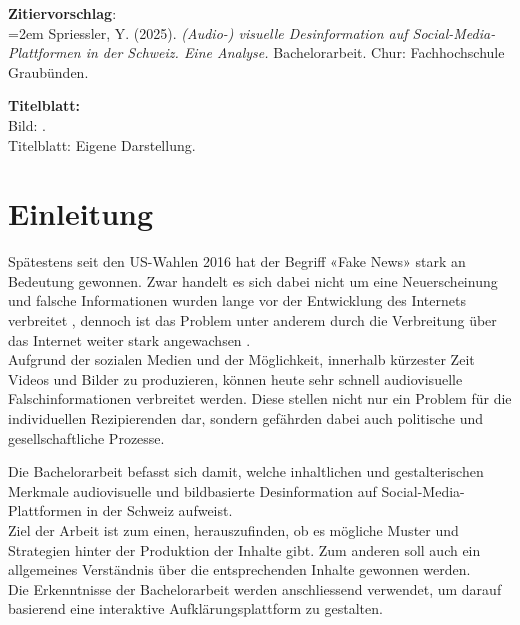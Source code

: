 \documentclass[12pt,a4paper]{article}        %
\begin{document}
\textbf{Zitiervorschlag}:\\
\hangindent=2em
Spriessler, Y. (2025). \textit{(Audio-) visuelle Desinformation auf Social-Media-Plattformen in der Schweiz. Eine Analyse.} Bachelorarbeit. Chur: Fachhochschule Graubünden.

\textbf{Titelblatt:}\\
Bild: .\\
Titelblatt: Eigene Darstellung.
\pagebreak
\thispagestyle{empty}
\tableofcontents        %
\pagebreak

\listoffigures
\listoftables
\pagebreak
\setcounter{page}{1}    %
\section{Einleitung}
Spätestens seit den US-Wahlen 2016 hat der Begriff «Fake News» stark an Bedeutung gewonnen. Zwar handelt es sich dabei nicht um eine Neuerscheinung und falsche Informationen wurden lange vor der Entwicklung des Internets verbreitet \parencites[214]{allcott_social_2017}[247]{hohlfeld_schlechte_2020}[1]{khan_fake_2021}, dennoch ist das Problem unter anderem durch die Verbreitung über das Internet weiter stark angewachsen \parencites[214–215]{allcott_social_2017}[1]{khan_fake_2021}[1]{lazer_science_2018}[4]{ceron_fake_2021}.\\
Aufgrund der sozialen Medien und der Möglichkeit, innerhalb kürzester Zeit Videos und Bilder zu produzieren, können heute sehr schnell audiovisuelle Falschinformationen verbreitet werden. Diese stellen nicht nur ein Problem für die individuellen Rezipierenden dar, sondern gefährden dabei auch politische und gesellschaftliche Prozesse.

Die Bachelorarbeit befasst sich damit, welche inhaltlichen und gestalterischen Merkmale audiovisuelle und bildbasierte Desinformation auf Social-Media-Plattformen in der Schweiz aufweist. \\
Ziel der Arbeit ist zum einen, herauszufinden, ob es mögliche Muster und Strategien hinter der Produktion der Inhalte gibt. Zum anderen soll auch ein allgemeines Verständnis über die entsprechenden Inhalte gewonnen werden. \\
Die Erkenntnisse der Bachelorarbeit werden anschliessend verwendet, um darauf basierend eine interaktive Aufklärungsplattform zu gestalten.
\end{document}

